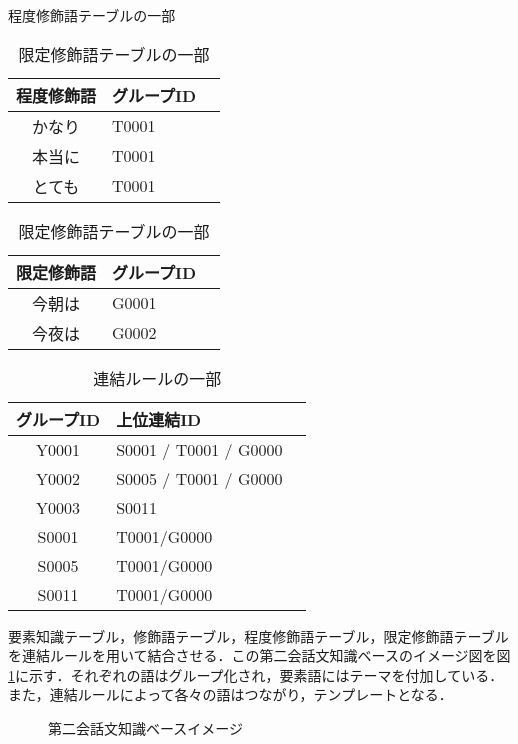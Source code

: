 \begin{table}[htbp]
  \begin{minipage}{.48\linewidth}
    \begin{center}
      \caption{程度修飾語テーブルの一部}
      \label{tb:teidosyusyokugo}
      \begin{tabular}{clc}
        \hline
        程度修飾語 & グループID \\
        \hline
        かなり & T0001 \\
        本当に & T0001 \\
        とても & T0001 \\
        \hline
      \end{tabular}
    \end{center}
  \end{minipage}
  \begin{minipage}{.48\linewidth}
    \begin{center}
      \caption{限定修飾語テーブルの一部}
      \label{tb:genteisyusyokugo}
      \begin{tabular}{clc}
        \hline
        限定修飾語 & グループID \\
        \hline
        今朝は 	& G0001 \\
        今夜は 	& G0002 \\
        \hline
      \end{tabular}
    \end{center}
    \end{minipage}
\end{table}
\begin{table}[htbp]
    \begin{center}
      \caption{連結ルールの一部}
      \label{tb:renketu}
      \begin{tabular}{clc}
        \hline
        グループID & 上位連結ID \\
        \hline
        Y0001 &	S0001 / T0001 / G0000 \\
		Y0002 &	S0005 / T0001 / G0000 \\
		Y0003 &	S0011 \\
		S0001 &	T0001/G0000 \\
		S0005 &	T0001/G0000 \\
		S0011 &	T0001/G0000 \\
        \hline
      \end{tabular}
    \end{center}
\end{table}
要素知識テーブル，修飾語テーブル，程度修飾語テーブル，限定修飾語テーブルを連結ルールを用いて結合させる．この第二会話文知識ベースのイメージ図を図\ref{fig:kaiwaDB2img}に示す．それぞれの語はグループ化され，要素語にはテーマを付加している．また，連結ルールによって各々の語はつながり，テンプレートとなる．
\begin{figure}[htbp]
	\begin{center}
	  	\epsfxsize=8cm
		\caption{第二会話文知識ベースイメージ}
		\label{fig:kaiwaDB2img}
	\end{center}
\end{figure}

